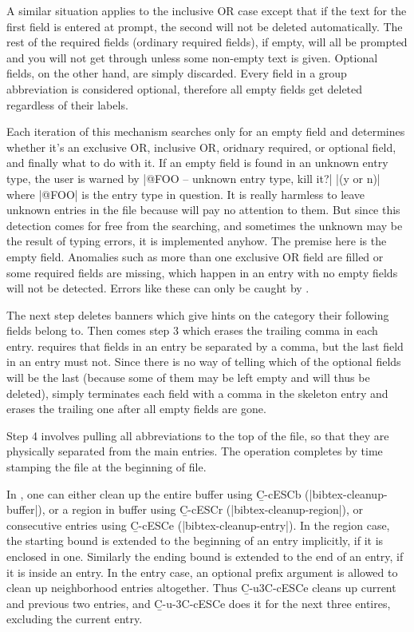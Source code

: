 A similar situation applies to the inclusive OR case except that
if the text for the first field is entered at prompt, the second will not be
deleted automatically.  The rest of the required fields (ordinary required
fields), if empty, will all be prompted
and you will not get through unless some non-empty text is given.
Optional fields, on the other hand, are simply discarded.
Every field in a group abbreviation is considered optional, therefore
all empty fields get deleted regardless of their labels.

Each iteration of this mechanism searches only for an empty field and
determines whether it's an exclusive OR, inclusive OR, oridnary required,
or optional field, and finally what to do with it.
If an empty field is found in an unknown entry type, the user is warned by
\begindisplay
|@FOO -- unknown entry type, kill it?| |(y or n)|\cr
\enddisplay
where |@FOO| is the entry type in question.  It is really harmless to
leave unknown entries in the file because {\BibTeX} will pay no attention
to them.  But since this detection comes for free from
the searching, and sometimes the unknown may be the result of typing errors,
it is implemented anyhow.  The premise here is the empty field.
Anomalies such as more than one exclusive OR field are filled 
or some required fields are missing, which happen in an entry with no
empty fields will not be detected.
Errors like these can only be caught by {\BibTeX}.

The next step deletes banners which give hints on the category their
following fields belong to.  Then comes step 3 which erases the trailing
comma in each entry.  {\BibTeX} requires that fields
in an entry be separated by a comma, but the last field in an entry
must not.  Since there is no way of telling which
of the optional fields will be the last (because some of them may be left
empty and will thus be deleted), {\BM} simply terminates each field
with a comma in the skeleton entry and erases the trailing one after all
empty fields are gone.

Step 4 involves pulling all abbreviations to the top of the file,
so that they are physically separated from the main entries.
The operation completes by time stamping the file at the beginning of file.

In {\BM}, one can either clean up the entire buffer using {\b C-c{\s}ESC{\s}b}
(|bibtex-cleanup-buffer|), or a region in buffer using {\b C-c{\s}ESC{\s}r}
(|bibtex-cleanup-region|), or consecutive entries using {\b C-c{\s}ESC{\s}e}
(|bibtex-cleanup-entry|).  In the region case, the starting bound is extended
to the beginning of an entry implicitly, if it is enclosed in one.
Similarly the ending bound is extended to the end of an entry, if
it is inside an entry.
In the entry case, an optional prefix argument is allowed to clean up
neighborhood entries altogether.  Thus {\b C-u{\s}3{\s}C-c{\s}ESC{\s}e}
cleans up current and previous two entries, and
{\b C-u{\s}-3{\s}C-c{\s}ESC{\s}e} does it for the next three entires,
excluding the current entry.



